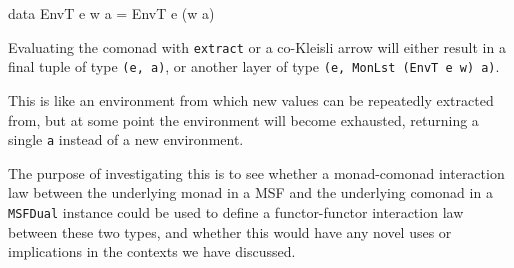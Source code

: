 \begin{haskell}
data EnvT e w a = EnvT e (w a)
\end{haskell}

Evaluating the comonad with \verb+extract+ or a co-Kleisli arrow will either result in a final tuple of type \verb+(e, a)+, or another layer of type \verb+(e, MonLst (EnvT e w) a)+.

This is like an environment from which new values can be repeatedly extracted from, but at some point the environment will become exhausted, returning a single \verb+a+ instead of a new environment.

The purpose of investigating this is to see whether a monad-comonad interaction law \cite{uustalu:2019} between the underlying monad in a MSF and the underlying comonad in a \verb+MSFDual+ instance could be used to define a functor-functor interaction law between these two types, and whether this would have any novel uses or implications in the contexts we have discussed.